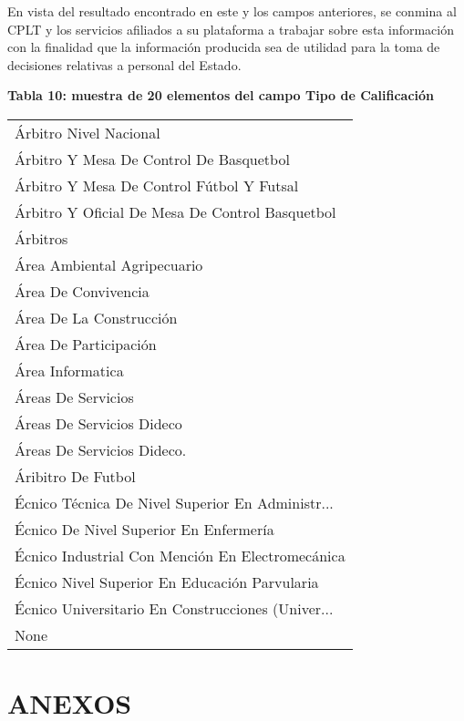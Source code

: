 \documentclass[11pt]{article}
\begin{document}
En vista del resultado encontrado en este y los campos anteriores, se
conmina al CPLT y los servicios afiliados a su plataforma a trabajar
sobre esta información con la finalidad que la información producida sea
de utilidad para la toma de decisiones relativas a personal del Estado.

    \textbf{Tabla 10: muestra de 20 elementos del campo Tipo de
Calificación}

    
    \begin{tabular}{l}
\toprule
                            Árbitro Nivel Nacional \\
           Árbitro Y Mesa De Control De Basquetbol \\
         Árbitro Y Mesa De Control Fútbol Y Futsal \\
   Árbitro Y Oficial De Mesa De Control Basquetbol \\
                                          Árbitros \\
                       Área Ambiental Agripecuario \\
                               Área De Convivencia \\
                           Área De La Construcción \\
                             Área De Participación \\
                                  Área Informatica \\
                                Áreas De Servicios \\
                         Áreas De Servicios Dideco \\
                        Áreas De Servicios Dideco. \\
                                Áribitro De Futbol \\
 Écnico  Técnica De Nivel Superior En Administr... \\
            Écnico De Nivel Superior En Enfermería \\
  Écnico Industrial Con Mención En Electromecánica \\
     Écnico Nivel Superior En Educación Parvularia \\
 Écnico Universitario En Construcciones (Univer... \\
                                              None \\
\bottomrule
\end{tabular}

    
    \hypertarget{anexos}{%
\section{ANEXOS}\label{anexos}}
\end{document}
